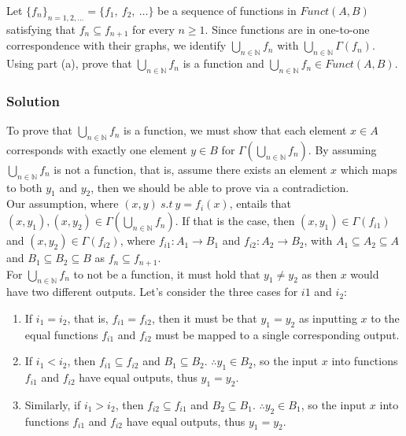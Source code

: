 \documentclass[12pt]{article}
\begin{document}
Let $\{ f_n \}_{n=1,2,\ldots} = \{f_1,\ f_2,\ \ldots \}$ be a sequence of functions in $Funct(A, B)$ satisfying that $f_n \subseteq f_{n+1}$ for every $n \geq 1$.
Since functions are in one-to-one correspondence with their graphs, we identify $\bigcup\limits_{n \in \mathbb{N}} f_n$ with $\bigcup\limits_{n \in \mathbb{N}} \Gamma (f_n)$.
Using part (a), prove that $\bigcup\limits_{n \in \mathbb{N}} f_n$ is a function and $\bigcup\limits_{n \in \mathbb{N}} f_n \in Funct(A, B)$.

\subsubsection*{Solution}

To prove that $\bigcup\limits_{n \in \mathbb{N}} f_n$ is a function, we must show that each element $x \in A$ corresponds with exactly one element $y \in B$ for $\Gamma(\bigcup\limits_{n \in \mathbb{N}} f_n)$.
By assuming $\bigcup\limits_{n \in \mathbb{N}} f_n$ is not a function, that is, assume there exists an element $x$ which maps to both $y_1$ and $y_2$, then we should be able to prove via a contradiction.\\
\null\newline
Our assumption, where $(x,y)\ s.t\ y = f_i(x)$, entails that $(x, y_1),(x, y_2) \in \Gamma(\bigcup\limits_{n \in \mathbb{N}} f_n)$.
If that is the case, then $(x,y_1) \in \Gamma(f_{i1})$ and $(x,y_2) \in \Gamma(f_{i2})$, where $f_{i1} : A_1 \rightarrow B_1$ and $f_{i2} : A_2 \rightarrow B_2$, with $A_1 \subseteq A_2 \subseteq A$ and $B_1 \subseteq B_2 \subseteq B$ as $f_n \subseteq f_{n+1}$.\\
\null\newline
For $\bigcup\limits_{n \in \mathbb{N}} f_n$ to not be a function, it must hold that $y_1 \neq y_2$ as then $x$ would have two different outputs. Let's consider the three cases for $i1$ and $i_2$:
\begin{enumerate}[label = \textbf{(\roman*)}]
	\item If $i_1 = i_2$, that is, $f_{i1} = f_{i2}$, then it must be that $y_1 = y_2$ as inputting $x$ to the equal functions $f_{i1}$ and $f_{i2}$ must be mapped to a single corresponding output.
	\item If $i_1 < i_2$, then $f_{i1} \subseteq f_{i2}$ and $B_1 \subseteq B_2$. $\therefore y_1 \in B_2$, so the input $x$ into functions $f_{i1}$ and $f_{i2}$ have equal outputs, thus $y_1 = y_2$.
	\item Similarly, if $i_1 > i_2$, then $f_{i2} \subseteq f_{i1}$ and $B_2 \subseteq B_1$. $\therefore y_2 \in B_1$, so the input $x$ into functions $f_{i1}$ and $f_{i2}$ have equal outputs, thus $y_1 = y_2$.
\end{enumerate}
\end{document}
